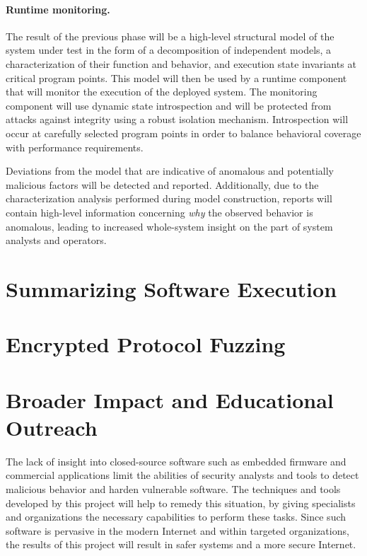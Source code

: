 \documentclass[letterpaper,twoside,11pt,headings=small]{scrartcl}
\begin{document}
\paragraph{Runtime monitoring.} The result of the previous phase will be a
high-level structural model of the system under test in the form of a
decomposition of independent models, a characterization of their function and
behavior, and execution state invariants at critical program points.  This
model will then be used by a runtime component that will monitor the execution
of the deployed system. The monitoring component will use dynamic state
introspection and will be protected from attacks against integrity using a
robust isolation mechanism. Introspection will occur at carefully selected
program points in order to balance behavioral coverage with performance
requirements.

Deviations from the model that are indicative of anomalous and potentially
malicious factors will be detected and reported.  Additionally, due to the
characterization analysis performed during model construction, reports will
contain high-level information concerning \emph{why} the observed behavior is
anomalous, leading to increased whole-system insight on the part of system
analysts and operators.

\section{Summarizing Software Execution}
\label{sec:research:autosummary}



\section{Encrypted Protocol Fuzzing}
\label{sec:research:fuzzing}



\section{Broader Impact and Educational Outreach}
\label{sec:impact}

The lack of insight into closed-source software such as embedded firmware and
commercial applications limit the abilities of security analysts and tools to
detect malicious behavior and harden vulnerable software.  The techniques and
tools developed by this project will help to remedy this situation, by
giving specialists and organizations the necessary capabilities to perform
these tasks.  Since such software is pervasive in the modern Internet and
within targeted organizations, the results of this project will result in
safer systems and a more secure Internet.
\end{document}
